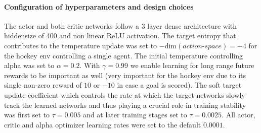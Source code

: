 \paragraph{Configuration of hyperparameters and design choices}
The actor and both critic networks follow a 3 layer dense architecture with hiddensize of 400 and non linear ReLU activation. The target entropy that contributes to the temperature update was set to $-\text{dim}(\textit{action-space}) = -4$ for the hockey env controlling a single agent. The initial temperature controlling alpha was set to $\alpha = 0.2$. With $\gamma = 0.99$ we enable learning for long range future rewards to be important as well (very important for the hockey env due to its single non-zero reward of $10$ or $-10$ in case a goal is scored). The soft target update coefficient which controls the rate at which the target networks slowly track the learned networks and thus playing a crucial role in training stability was first set to $\tau = 0.005$ and at later training stages set to $\tau = 0.0025$. All actor, critic and alpha optimizer learning rates were set to the default $0.0001$. 
\begin{figure}[htbp]
    \centering
    \hspace{0.5cm}
    \label{fig:SAC-perf}
\end{figure}
